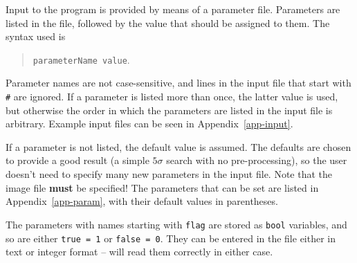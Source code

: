 %
%
%
%
\label{sec-param}

Input to the program is provided by means of a parameter
file. Parameters are listed in the file, followed by the value that
should be assigned to them. The syntax used is 
\begin{quote}
\texttt{parameterName value}.
\end{quote}
Parameter names are not case-sensitive, and lines in the input
file that start with \texttt{\#} are ignored. If a parameter is listed
more than once, the latter value is used, but otherwise the order in
which the parameters are listed in the input file is
arbitrary. Example input files can be seen in
Appendix~\ref{app-input}.

If a parameter is not listed, the default value is assumed. The
defaults are chosen to provide a good result (a simple $5\sigma$
search with no pre-processing), so the user doesn't need to specify
many new parameters in the input file. Note that the image file
\textbf{must} be specified!  The parameters that can be set are listed
in Appendix~\ref{app-param}, with their default values in parentheses.

The parameters with names starting with \texttt{flag} are stored as
\texttt{bool} variables, and so are either \texttt{true = 1} or
\texttt{false = 0}. They can be entered in the file either in text or
integer format -- \duchamp will read them correctly in either case.

